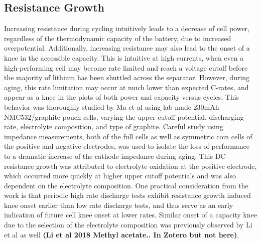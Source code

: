 \documentclass{article}
\newcommand{\pbox}[1]{{
\fbox{
\parbox{0.8\textwidth}{  \fbox{$\triangleright$\textcolor{blue}{\textbf{From Peter}:}} 
#1
}}}}
\begin{document}
\subsection{Resistance Growth}
\pbox{
Ready to edit
}
Increasing resistance during cycling intuitively leads to a decrease of cell power, regardless of the thermodynamic capacity of the battery, due to increased overpotential. Additionally, increasing resistance may also lead to the onset of a knee in the accessible capacity. This is intuitive at high currents, when even a high-performing cell may become rate limited and reach a voltage cutoff before the majority of lithium has been shuttled across the separator. However, during aging, this rate limitation may occur at much lower than expected C-rates, and appear as a knee in the plots of both power and capacity versus cycles. This behavior was thoroughly studied by Ma et al \cite{ma_editors_2019} using lab-made 230mAh NMC532/graphite pouch cells, varying the upper cutoff potential, discharging rate, electrolyte composition, and type of graphite. Careful study using impedance measurements, both of the full cells as well as symmetric coin cells of the positive and negative electrodes, was used to isolate the loss of performance to a dramatic increase of the cathode impedance during aging. This DC resistance growth was attributed to electrolyte oxidation at the positive electrode, which occurred more quickly at higher upper cutoff potentials and was also dependent on the electrolyte composition. One practical consideration from the work is that periodic high rate discharge tests exhibit resistance growth induced knee onset earlier than low rate discharge tests, and thus serve as an early indication of future cell knee onset at lower rates. Similar onset of a capacity knee due to the selection of the electrolyte composition was previously observed by Li et al as well \textbf{(Li et al 2018 Methyl acetate.. In Zotero but not here)}. 
\end{document}
